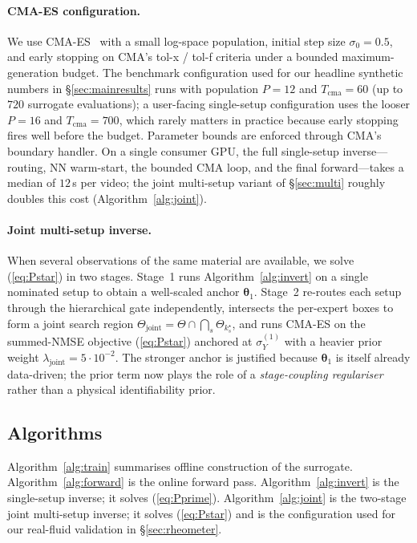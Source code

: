 \paragraph{CMA-ES configuration.}
We use CMA-ES~\cite{hansen2016cma,bajaj2019gaussian} with a small
log-space population, initial step size $\sigma_{0} = 0.5$, and
early stopping on CMA's tol-x / tol-f criteria under a bounded
maximum-generation budget. The benchmark configuration used for our
headline synthetic numbers in \S\ref{sec:mainresults} runs with
population $P = 12$ and $T_{\mathrm{cma}} = 60$ (up to $720$
surrogate evaluations); a user-facing single-setup configuration
uses the looser $P = 16$ and $T_{\mathrm{cma}} = 700$, which rarely
matters in practice because early stopping fires well before the
budget. Parameter bounds are
enforced through CMA's boundary handler. On a single consumer GPU,
the full single-setup inverse---routing, NN warm-start, the bounded
CMA loop, and the final forward---takes a median of $12$\,s per
video; the joint multi-setup variant of \S\ref{sec:multi} roughly
doubles this cost (Algorithm~\ref{alg:joint}).

\paragraph{Joint multi-setup inverse.}
When several observations of the same material are available, we
solve (\ref{eq:Pstar}) in two stages. Stage~1 runs
Algorithm~\ref{alg:invert} on a single nominated setup to obtain a
well-scaled anchor $\boldsymbol{\theta}_{1}$. Stage~2 re-routes each
setup through the hierarchical gate independently, intersects the
per-expert boxes to form a joint search region
$\Theta_{\mathrm{joint}} = \Theta \cap \bigcap_{s}
\Theta_{k_{s}^{\star}}$, and runs CMA-ES on the
summed-NMSE objective (\ref{eq:Pstar}) anchored at $\sigma_Y^{(1)}$
with a heavier prior weight $\lambda_{\mathrm{joint}} = 5\cdot 10^{-2}$.
The stronger anchor is justified because $\boldsymbol{\theta}_{1}$
is itself already data-driven; the prior term now plays the role of
a \emph{stage-coupling regulariser} rather than a physical
identifiability prior.


\subsection{Algorithms}
\label{sec:algs}

Algorithm~\ref{alg:train} summarises offline construction of the
surrogate. Algorithm~\ref{alg:forward} is the online forward pass.
Algorithm~\ref{alg:invert} is the single-setup inverse; it solves
(\ref{eq:Pprime}).
Algorithm~\ref{alg:joint} is the two-stage joint multi-setup
inverse; it solves (\ref{eq:Pstar}) and is the configuration used
for our real-fluid validation in \S\ref{sec:rheometer}.

